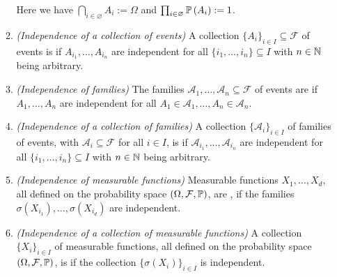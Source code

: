 \begin{enumerate}
\begin{enumerate}
\begin{note}
Here we have \(\bigcap_{i\in \varnothing}^{}A_i:=\Omega\) and
\(\prod_{i\in\varnothing}^{}\mathbb{P}\left(A_i\right):=1\).
\end{note}
\item \emph{(Independence of a collection of events)} A collection
\(\{A_i\}_{i\in I}\subseteq \mathcal{F}\) of events is  if
\(A_{i_1},\dotsc,A_{i_n}\) are independent for all
\(\{i_1,\dotsc,i_n\}\subseteq I\) with \(n\in\mathbb{N}\) being arbitrary.
\item \emph{(Independence of families)} The families
\(\mathcal{A}_1,\dotsc,\mathcal{A}_n\subseteq \mathcal{F}\) of events are
 if \(A_1,\dotsc,A_n\) are independent for all
\(A_1\in\mathcal{A}_1,\dotsc,A_n\in\mathcal{A}_n\).
\item \emph{(Independence of a collection of families)} A collection
\(\{\mathcal{A}_i\}_{i\in I}\) of families of events, with
\(\mathcal{A}_i\subseteq \mathcal{F}\) for all \(i\in I\), is
 if \(\mathcal{A}_{i_1},\dotsc,\mathcal{A}_{i_n}\) are
independent for all \(\{i_1,\dotsc,i_n\}\subseteq I\) with \(n\in\mathbb{N}\) being
arbitrary.
\item \emph{(Independence of measurable functions)} Measurable functions
\(X_1,\dotsc,X_d\), all defined on the probability space
\((\Omega,\mathcal{F},\mathbb{P})\), are , if the families
\(\sigma(X_{i_1}),\dotsc,\sigma(X_{i_d})\) are independent.
\item \emph{(Independence of a collection of measurable functions)} A
collection \(\{X_i\}_{i\in I}\) of measurable functions, all defined on the
probability space \((\Omega,\mathcal{F},\mathbb{P})\), is  if the
collection \(\{\sigma(X_i)\}_{i\in I}\) is independent.


\end{enumerate}
\end{enumerate}
